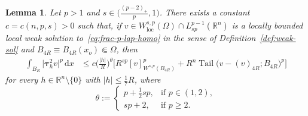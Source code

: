 \documentclass[10pt,letterpaper]{amsart}
\newtheorem{lemma}[theorem]{Lemma}
\theoremstyle{definition}
\numberwithin{theorem}{section}
\numberwithin{equation}{section}
\newcommand{\R}{\ensuremath{\mathbb{R}}}
\newcommand{\1}{\ensuremath{\mathds{1}}}
\newcommand{\dx}{\mathrm{d}x}
\DeclareMathOperator{\loc}{loc}
\DeclareMathOperator{\Tail}{Tail}
\numberwithin{equation}{section}
\begin{document}
\begin{lemma}\label{lem:2nd-diffquot-homo}
Let $p>1$ and $s\in\big(\frac{(p-2)_+}{p},1\big)$. There exists a constant
$c=c(n,p,s)>0$ such that, if
$v\in W^{s,p}_{\loc}(\Omega)\cap L^{p-1}_{sp}(\R^n)$ is a locally bounded
local weak solution to~\eqref{eq:frac-p-lap-homo} in the sense of Definition~\ref{def:weak-sol}  and
$B_{4R}\equiv B_{4R}(x_o)\Subset\Omega$, then
\begin{align*}
    \int_{B_R} \big|\boldsymbol{\tau}_h^2 v\big|^p \,\dx
    &\le
    c\Big(\frac{|h|}{R}\Big)^{\theta}
    \Big[
        R^{sp}[v]_{W^{s,p}(B_{4R})}^p
        + R^{n}\Tail\big(v-(v)_{4R};B_{4R}\big)^p
    \Big]
\end{align*}
for every $h\in\R^n\setminus\{0\}$ with $|h|\le \tfrac17 R$, where
\begin{equation}\label{def:theta}
    \theta :=
    \left\{
    \begin{array}{cl}
        p+\frac12 sp, & \text{if } p\in(1,2),\\[3pt]
        sp+2, & \text{if } p\ge2.
    \end{array}
    \right.
\end{equation}
\end{lemma}
\end{document}
